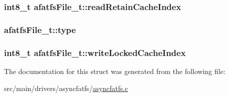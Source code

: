 \hypertarget{structafatfsFile__t_afdd843dde7d469bec8a279356157db07}{
\subsubsection[{read\+Retain\+Cache\+Index}]{\setlength{\rightskip}{0pt plus 5cm}int8\+\_\+t afatfs\+File\+\_\+t\+::read\+Retain\+Cache\+Index}}\label{structafatfsFile__t_afdd843dde7d469bec8a279356157db07}
\hypertarget{structafatfsFile__t_aad216d36b3b37885f775486e7e9df06f}{
\subsubsection[{type}]{ afatfs\+File\+\_\+t\+::type}}\label{structafatfsFile__t_aad216d36b3b37885f775486e7e9df06f}
\hypertarget{structafatfsFile__t_afb0932f6f78d43535cc6736ed96ab6a5}{
\subsubsection[{write\+Locked\+Cache\+Index}]{\setlength{\rightskip}{0pt plus 5cm}int8\+\_\+t afatfs\+File\+\_\+t\+::write\+Locked\+Cache\+Index}}\label{structafatfsFile__t_afb0932f6f78d43535cc6736ed96ab6a5}


The documentation for this struct was generated from the following file\+:\begin{DoxyCompactItemize}
\item 
src/main/drivers/asyncfatfs/\hyperlink{asyncfatfs_8c}{asyncfatfs.\+c}\end{DoxyCompactItemize}
